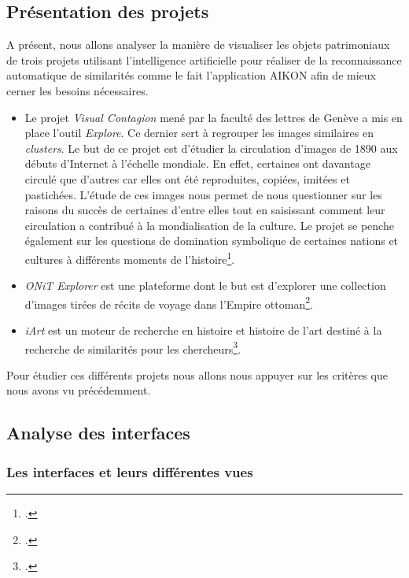 \subsection{Présentation des projets}

A présent, nous allons analyser la manière de visualiser les objets patrimoniaux de trois projets utilisant l'intelligence artificielle pour réaliser de la reconnaissance automatique de similarités comme le fait l'application AIKON afin de mieux cerner les besoins nécessaires.

\begin{itemize}
	\item Le projet \textit{Visual Contagion} mené par la faculté des lettres de Genève a mis en place l'outil \textit{Explore}. Ce dernier sert à regrouper les images similaires en \textit{clusters}. Le but de ce projet est d'étudier la circulation d'images de 1890 aux débuts d'Internet à l'échelle mondiale. En effet, certaines ont davantage circulé que d'autres car elles ont été reproduites, copiées, imitées et pastichées. L'étude de ces images nous permet de nous questionner sur les raisons du succès de certaines d'entre elles tout en saisissant comment leur circulation a contribué à la mondialisation de la culture. Le projet se penche également sur les questions de domination symbolique de certaines nations et cultures à différents moments de l'histoire\footcite{HomeVisualContagions}.
	\item \textit{ONiT Explorer} est une plateforme dont le but est d'explorer une collection d'images tirées de récits de voyage dans l'Empire ottoman\footcite{ONiTExplorer}.
	\item \textit{iArt} est un moteur de recherche en histoire et histoire de l'art destiné à la recherche de similarités pour les chercheurs\footcite{IART}.
\end{itemize}

Pour étudier ces différents projets nous allons nous appuyer sur les critères que nous avons vu précédemment. 

\subsection{Analyse des interfaces}

\subsubsection{Les interfaces et leurs différentes vues}

